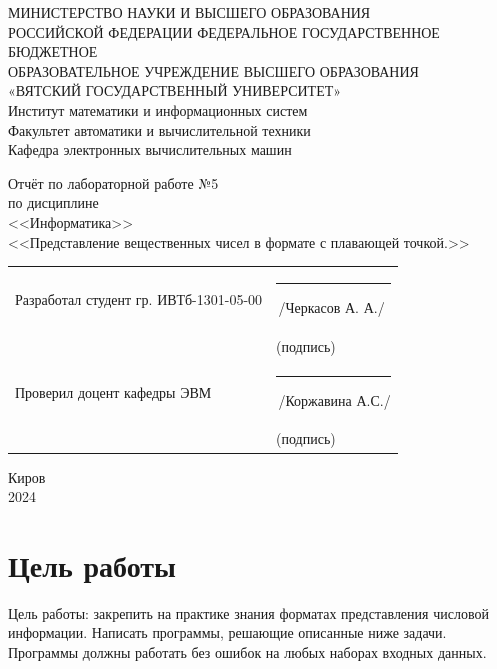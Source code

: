 \documentclass[oneside,a4paper,14pt]{extarticle}
\begin{document}
\newpage
\thispagestyle{empty}
\begin{center}
	МИНИСТЕРСТВО НАУКИ И ВЫСШЕГО ОБРАЗОВАНИЯ\\
	РОССИЙСКОЙ ФЕДЕРАЦИИ
	ФЕДЕРАЛЬНОЕ ГОСУДАРСТВЕННОЕ БЮДЖЕТНОЕ\\
	ОБРАЗОВАТЕЛЬНОЕ
	УЧРЕЖДЕНИЕ ВЫСШЕГО ОБРАЗОВАНИЯ\\
	«ВЯТСКИЙ ГОСУДАРСТВЕННЫЙ УНИВЕРСИТЕТ»\\
	Институт математики и информационных систем\\
	Факультет автоматики и вычислительной техники\\
	Кафедра электронных вычислительных машин
\end{center}
\vspace{20mm}

\begin{center}
	Отчёт по лабораторной работе №5\\
	по дисциплине\\
	<<Информатика>>\\
	<<Представление вещественных чисел в формате с плавающей точкой.>>\\
\end{center}
\vspace{40mm}
\noindent
\begin{tabular}{ll}
	Разработал студент гр. ИВТб-1301-05-00 & \rule[-1mm]{30mm}{0.10mm}\,/Черкасов А. А./ \\
	                                       & \hspace{8mm}\footnotesize(подпись)          \\

	Проверил доцент кафедры ЭВМ            & \rule[-1mm]{30mm}{0.10mm}\,/Коржавина А.С./ \\
	                                       & \hspace{8mm}\footnotesize(подпись)          \\
\end{tabular}

\vfill
\begin{center}
	Киров\\
	2024
\end{center}

\newpage\thispagestyle{plain}
\section*{Цель работы}
Цель работы: закрепить на практике знания форматах представления числовой
информации. Написать программы, решающие описанные ниже задачи. Программы должны
работать без ошибок на любых наборах входных данных.
\end{document}
